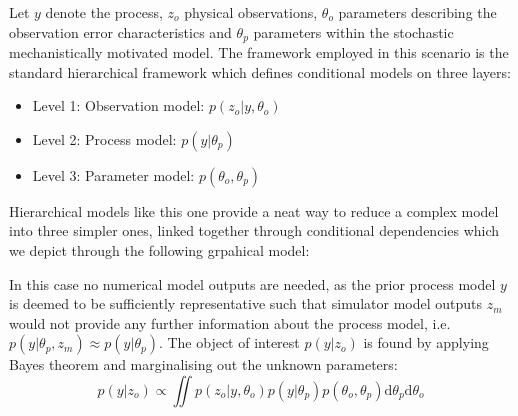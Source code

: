 \documentclass[10pt,a4paper]{article}
\newcommand{\intd} {\textrm{d}}
\begin{document}
Let $y$ denote the process, $z_o$ physical observations, $\theta_o$ parameters describing the observation error characteristics and $\theta_p$ parameters within the stochastic mechanistically motivated model. The framework employed in this scenario is the standard hierarchical framework \citep[e.g.][]{Wikle_2003} which defines conditional models on three layers:
\begin{itemize}
\item Level 1: Observation model: $p(z_o | y, \theta_o)$
\item Level 2: Process model: $p(y | \theta_p)$
\item Level 3: Parameter model: $p(\theta_o, \theta_p)$
\end{itemize}
\noindent Hierarchical models like this one provide a neat way to reduce a complex model into three simpler ones, linked together through conditional dependencies which we depict through the following grpahical model:

\begin{figure}[h!]
\centering
{}
\end{figure}

\noindent In this case no numerical model outputs are needed, as the prior process model $y$ is deemed to be sufficiently representative such that simulator model outputs $z_m$ would not provide any further information about the process model, i.e. $p(y | \theta_p,z_m) \approx p(y | \theta_p)$. The object of interest $p(y|z_o)$ is found by applying Bayes theorem and marginalising out the unknown parameters:
\begin{equation}
p(y|z_o) \propto \iint p(z_o | y, \theta_o)p(y | \theta_p)p(\theta_o, \theta_p) \intd \theta_p \intd\theta_o
\end{equation}
\end{document}
